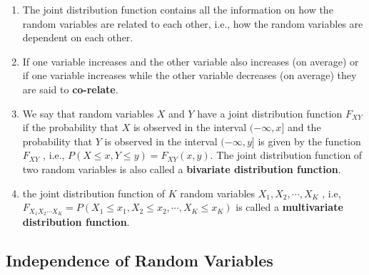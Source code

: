 \begin{enumerate}
    \item The joint distribution function contains all the information on how the random variables are related to each other, i.e., how the random variables are dependent on each other.
    \hfill \cite{statistics/book/Statistics-for-Data-Scientists/Maurits-Kaptein}

    \item If one variable increases and the other variable also increases (on average) or if one variable increases while the other variable decreases (on average) they are said to \textbf{co-relate}.
    \hfill \cite{statistics/book/Statistics-for-Data-Scientists/Maurits-Kaptein}

    \item We say that random variables $X$ and $Y$ have a joint distribution function $F _{X Y}$ if the probability that $X$ is observed in the interval $(-\infty, x]$ and the probability that $Y$ is observed in the interval $(-\infty, y]$ is given by the function $F _{X Y}$ , i.e., $P (X \leq x, Y \leq y) = F _{X Y} (x, y)$.
    The joint distribution function of two random variables is also called a \textbf{bivariate distribution function}.
    \hfill \cite{statistics/book/Statistics-for-Data-Scientists/Maurits-Kaptein}

    \item the joint distribution function of $K$ random variables $X_1, X_2, \cdots , X_K$ , i.e,
    $F _{X_1 X_2 \cdots X _K} = P(X_1 \leq x_1, X_2 \leq x_2, \cdots , X_K \leq x_K )$
    is called a \textbf{multivariate distribution function}.
    \hfill \cite{statistics/book/Statistics-for-Data-Scientists/Maurits-Kaptein}
\end{enumerate}



\subsection{Independence of Random Variables}

